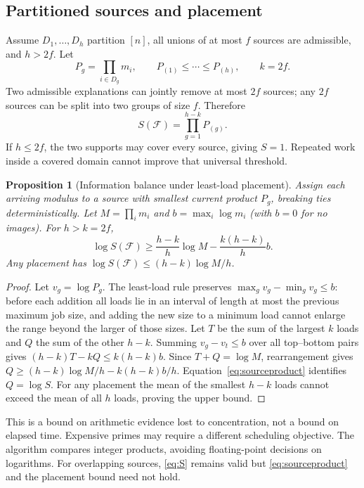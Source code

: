 \documentclass[11pt]{article}
\newtheorem{proposition}[theorem]{Proposition}
\theoremstyle{definition}\newtheorem{definition}[theorem]{Definition}
\newcommand{\F}{\mathcal F}
\begin{document}
\subsection{Partitioned sources and placement}
Assume $D_1,\ldots,D_h$ partition $[n]$, all unions of at most $f$ sources are admissible, and $h>2f$. Let
\begin{equation}
 P_g=\prod_{i\in D_g}m_i,\qquad
 P_{(1)}\le\cdots\le P_{(h)},\qquad k=2f.
\end{equation}
Two admissible explanations can jointly remove at most $2f$ sources; any $2f$ sources can be split into two groups of size $f$. Therefore
\begin{equation}\label{eq:sourceproduct}
 S(\F)=\prod_{g=1}^{h-k}P_{(g)}.
\end{equation}
If $h\le2f$, the two supports may cover every source, giving $S=1$. Repeated work inside a covered domain cannot improve that universal threshold.

\begin{proposition}[Information balance under least-load placement]\label{thm:balance}
Assign each arriving modulus to a source with smallest current product $P_g$, breaking ties deterministically. Let $M=\prod_i m_i$ and $b=\max_i\log m_i$ (with $b=0$ for no images). For $h>k=2f$,
\begin{equation}\label{eq:balance}
 \log S(\F)\ge\frac{h-k}{h}\log M-\frac{k(h-k)}h b.
\end{equation}
Any placement has $\log S(\F)\le(h-k)\log M/h$.
\end{proposition}
\begin{proof}
Let $v_g=\log P_g$. The least-load rule preserves $\max_g v_g-\min_g v_g\le b$: before each addition all loads lie in an interval of length at most the previous maximum job size, and adding the new size to a minimum load cannot enlarge the range beyond the larger of those sizes. Let $T$ be the sum of the largest $k$ loads and $Q$ the sum of the other $h-k$. Summing $v_g-v_t\le b$ over all top--bottom pairs gives $(h-k)T-kQ\le k(h-k)b$. Since $T+Q=\log M$, rearrangement gives $Q\ge(h-k)\log M/h-k(h-k)b/h$. Equation~\eqref{eq:sourceproduct} identifies $Q=\log S$. For any placement the mean of the smallest $h-k$ loads cannot exceed the mean of all $h$ loads, proving the upper bound.
\end{proof}
This is a bound on arithmetic evidence lost to concentration, not a bound on elapsed time. Expensive primes may require a different scheduling objective. The algorithm compares integer products, avoiding floating-point decisions on logarithms. For overlapping sources, \eqref{eq:S} remains valid but \eqref{eq:sourceproduct} and the placement bound need not hold.
\end{document}
